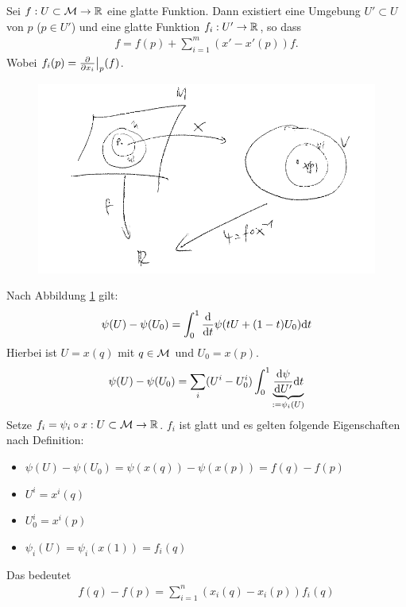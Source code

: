 \begin{lem}
\label{lem:DarstellungBasisTPM}
Sei $f: U \subset \mathcal{M} \to \mathbb{R}$ eine glatte Funktion.
Dann existiert eine Umgebung $U' \subset U$ von $p$ ($p \in U'$) und eine glatte Funktion
$f_i: U' \to \mathbb{R}$, so dass
\begin{align}
f = f(p) + \sum_{i=1}^{m} ( x' - x'(p)) f.
\end{align}
Wobei $f_i (p) = \pdv{x_i}\big\vert_{p} (f)$.
\end{lem}

\begin{bew} \leavevmode
\begin{figure}[h]
\centering
\includegraphics[width=0.8\linewidth]{figures/scan/lemma22.png}
\label{img:lemmaDarstellungBasisTPM}
\end{figure}
Nach Abbildung \ref{img:lemmaDarstellungBasisTPM} gilt:
\begin{align}
\psi(U) - \psi(U_0) = \int^1_0 \dv{t} \psi(t U + (1- t) U_0) \dd t
\end{align}
Hierbei ist $U=x(q)$ mit $q \in \mathcal{M}$ und $U_0 = x(p)$.
\begin{align}
\psi(U) - \psi(U_0) = \sum_i (U^i- U^i_0) \int^1_0 \underbrace{\dv{\psi}{U'} (t U + (1 - t) U_0) \dd t}_{:= \psi_i (U)}
\end{align}
Setze $f_i = \psi_i \circ x : U \subset \mathcal{M} \to \mathbb{R}$.
$f_i$ ist glatt und es gelten folgende Eigenschaften nach Definition:
\begin{itemize}
\item $\psi(U)- \psi(U_0) = \psi(x(q)) - \psi(x(p)) = f(q)- f(p)$
\item $U^i = x^i (q)$
\item $U_0^i = x^i(p)$
\item $\psi_i (U) = \psi_i (x(1)) = f_i(q)$
\end{itemize}
Das bedeutet
\begin{align}
f(q)- f(p) = \sum_{i=1}^n (x_i (q) - x_i (p)) f_i(q)

\end{align}
\end{bew}
